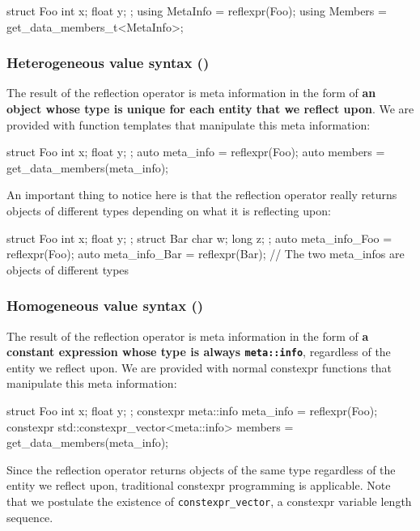 \documentclass{wg21}
\newcommand{\cc}[1]{\texttt{#1}}
\begin{document}
\begin{cpp}
struct Foo { int x; float y; };
using MetaInfo = reflexpr(Foo);
using Members = get_data_members_t<MetaInfo>;
\end{cpp}

\subsubsection{Heterogeneous value syntax (\cite{P0590})}
The result of the reflection operator is meta information in the form of
\textbf{an object whose type is unique for each entity that we reflect upon}.
We are provided with function templates that manipulate this meta information:

\begin{cpp}
struct Foo { int x; float y; };
auto meta_info = reflexpr(Foo);
auto members = get_data_members(meta_info);
\end{cpp}

An important thing to notice here is that the reflection operator really returns
objects of different types depending on what it is reflecting upon:

\begin{cpp}
struct Foo { int x; float y; };
struct Bar { char w; long z; };
auto meta_info_Foo = reflexpr(Foo);
auto meta_info_Bar = reflexpr(Bar);
// The two meta_infos are objects of different types
\end{cpp}

\subsubsection{Homogeneous value syntax (\cite{P0598})}
The result of the reflection operator is meta information in the form of
\textbf{a constant expression whose type is always \cc{meta::info}}, regardless
of the entity we reflect upon. We are provided with normal constexpr functions
that manipulate this meta information:

\begin{cpp}
struct Foo { int x; float y; };
constexpr meta::info meta_info = reflexpr(Foo);
constexpr std::constexpr_vector<meta::info> members = get_data_members(meta_info);
\end{cpp}

Since the reflection operator returns objects of the same type regardless of
the entity we reflect upon, traditional constexpr programming is applicable.
Note that we postulate the existence of \cc{constexpr_vector}, a constexpr
variable length sequence.
\end{document}
